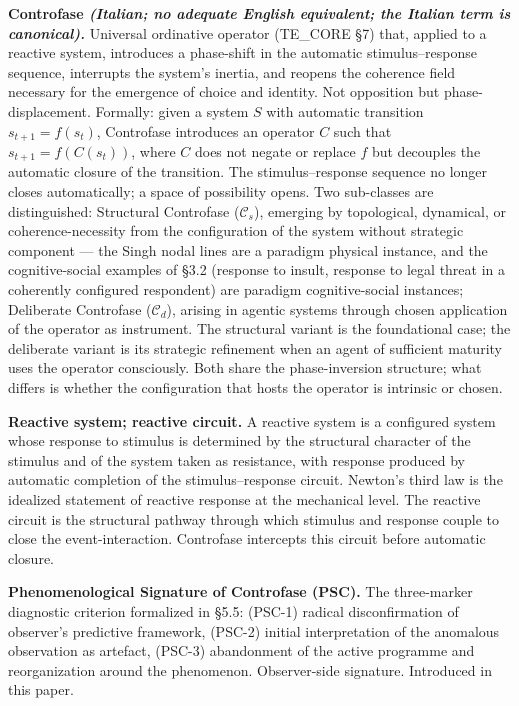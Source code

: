 \documentclass[
  11pt,
  a4paper,
]{article}
\begin{document}
\textbf{Controfase \emph{(Italian; no adequate English equivalent; the
Italian term is canonical).}} Universal ordinative operator (TE\_CORE
§7) that, applied to a reactive system, introduces a phase-shift in the
automatic stimulus--response sequence, interrupts the system's inertia,
and reopens the coherence field necessary for the emergence of choice
and identity. Not opposition but phase-displacement. Formally: given a
system \(S\) with automatic transition \(s_{t+1} = f(s_t)\), Controfase
introduces an operator \(C\) such that \(s_{t+1} = f(C(s_t))\), where
\(C\) does not negate or replace \(f\) but decouples the automatic
closure of the transition. The stimulus--response sequence no longer
closes automatically; a space of possibility opens. Two sub-classes are
distinguished: Structural Controfase (\(\mathcal{C}_s\)), emerging by
topological, dynamical, or coherence-necessity from the configuration of
the system without strategic component --- the Singh nodal lines are a
paradigm physical instance, and the cognitive-social examples of §3.2
(response to insult, response to legal threat in a coherently configured
respondent) are paradigm cognitive-social instances; Deliberate
Controfase (\(\mathcal{C}_d\)), arising in agentic systems through
chosen application of the operator as instrument. The structural variant
is the foundational case; the deliberate variant is its strategic
refinement when an agent of sufficient maturity uses the operator
consciously. Both share the phase-inversion structure; what differs is
whether the configuration that hosts the operator is intrinsic or
chosen.

\textbf{Reactive system; reactive circuit.} A reactive system is a
configured system whose response to stimulus is determined by the
structural character of the stimulus and of the system taken as
resistance, with response produced by automatic completion of the
stimulus--response circuit. Newton's third law is the idealized
statement of reactive response at the mechanical level. The reactive
circuit is the structural pathway through which stimulus and response
couple to close the event-interaction. Controfase intercepts this
circuit before automatic closure.

\textbf{Phenomenological Signature of Controfase (PSC).} The
three-marker diagnostic criterion formalized in §5.5: (PSC-1) radical
disconfirmation of observer's predictive framework, (PSC-2) initial
interpretation of the anomalous observation as artefact, (PSC-3)
abandonment of the active programme and reorganization around the
phenomenon. Observer-side signature. Introduced in this paper.
\end{document}
